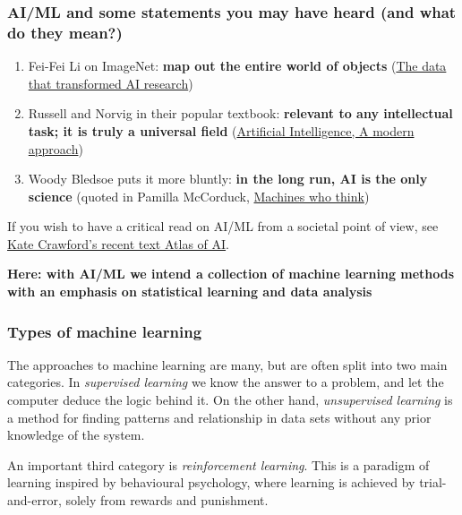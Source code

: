 \documentclass{beamer}
\begin{document}
\begin{frame}
\frametitle{AI/ML and some statements you may have heard (and what do they mean?)}

\begin{enumerate}
\item Fei-Fei Li on ImageNet: \textbf{map out the entire world of objects} (\href{{https://cacm.acm.org/news/219702-the-data-that-transformed-ai-research-and-possibly-the-world/fulltext}}{The data that transformed AI research})

\item Russell and Norvig in their popular textbook: \textbf{relevant to any intellectual task; it is truly a universal field} (\href{{http://aima.cs.berkeley.edu/}}{Artificial Intelligence, A modern approach})

\item Woody Bledsoe puts it more bluntly: \textbf{in the long run, AI is the only science} (quoted in Pamilla McCorduck, \href{{https://www.pamelamccorduck.com/machines-who-think}}{Machines who think})
\end{enumerate}

\noindent
If you wish to have a critical read on AI/ML from a societal point of view, see \href{{https://www.katecrawford.net/}}{Kate Crawford's recent text Atlas of AI}. 

\textbf{Here: with AI/ML we intend a collection of machine learning methods with an emphasis on statistical learning and data analysis}
\end{frame}

\begin{frame}
\frametitle{Types of machine learning}

\begin{block}{}
The approaches to machine learning are many, but are often split into two main categories. 
In \emph{supervised learning} we know the answer to a problem,
and let the computer deduce the logic behind it. On the other hand, \emph{unsupervised learning}
is a method for finding patterns and relationship in data sets without any prior knowledge of the system.

An important  third category is  \emph{reinforcement learning}. This is a paradigm 
of learning inspired by behavioural psychology, where learning is achieved by trial-and-error, 
solely from rewards and punishment.
\end{block}
\end{frame}
\end{document}
